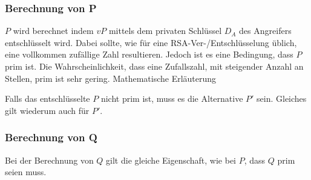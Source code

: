             \subsubsection{Berechnung von P}
                $P$ wird berechnet indem $vP$ mittels dem privaten Schlüssel $D_{A}$ des Angreifers entschlüsselt wird. Dabei sollte, wie für eine \ac{RSA}-Ver-/Entschlüsselung üblich, eine vollkommen zufällige Zahl resultieren. Jedoch ist es eine Bedingung, dass $P$ prim ist. 
                Die Wahrscheinlichkeit, dass eine Zufallszahl, mit steigender Anzahl an Stellen, prim ist sehr gering. 
                Mathematische Erläuterung %

                Falls das entschlüsselte $P$ nicht prim ist, muss es die Alternative $P'$ sein. Gleiches gilt wiederum auch für $P'$.

            \subsubsection{Berechnung von Q} \label{sec-kep-optQ}
                Bei der Berechnung von $Q$ gilt die gleiche Eigenschaft, wie bei $P$, dass $Q$ prim seien muss.

